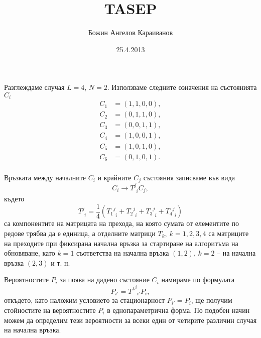 \documentclass[a4paper,10pt]{article}
\author{Божин Ангелов Караиванов}
\title{TASEP}
\date{25.4.2013}
\begin{document}
 \maketitle
Разглеждаме случая $L=4$, $N=2$. Използваме следните означения на състоянията $C_{i}$
\begin{equation}
\begin{split}
C_{1} &= (1, 1, 0, 0),\\
C_{2} &= (0, 1, 1, 0),\\
C_{3} &= (0, 0, 1, 1),\\
C_{4} &= (1, 0, 0, 1),\\
C_{5} &= (1, 0, 1, 0),\\
C_{6} &= (0, 1, 0, 1).\\
\end{split}
\end{equation}

Връзката между началните $C_i$ и крайните $C_j$ състояния записваме във вида
\begin{equation}
C_i \rightarrow T^{j}_{\phantom{j}i} C_j,
\end{equation}
където $$T^{j}_{\phantom{j}i} = \frac{1}{4}\left({T_1}^{j}_{\phantom{j}i} + {T_2}^{j}_{\phantom{j}i} + {T_3}^{j}_{\phantom{j}i} + {T_4}^{j}_{\phantom{j}i}\right)$$
са компонентите на матрицата на прехода, на която сумата от елементите по редове трябва да е единица,
а отделните матрици $T_{k},\ k=1,2,3,4$ са матриците на преходите при фиксирана начална връзка за
стартиране на алгоритъма на обновяване, като $k=1$ съответства на начална връзка $(1,2)$,
$k=2$ -- на начална връзка $(2,3)$ и т. н.

Вероятностите $P_i$ за поява на дадено състояние $C_i$ намираме по формулата
\begin{equation}
 P_{i'} = {T^{\mathtt{t}}}^{i}_{\phantom{i}i'} P_{i},
\end{equation}
откъдето, като наложим условието за стационарност $P_{i'}=P_{i}$, ще получим
стойностите на вероятностите $P_{i}$ в еднопараметрична форма.
По подобен начин можем да определим тези вероятности за всеки един
от четирите различин случая на начална връзка.
\end{document}
